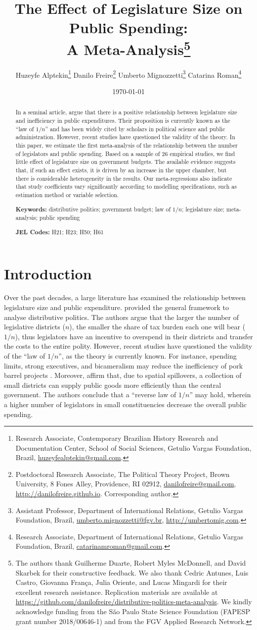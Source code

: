 \documentclass[a4paper,12pt]{article}
\title{The Effect of Legislature Size on Public Spending:\\ A Meta-Analysis\thanks{The authors thank Guilherme Duarte, Robert Myles McDonnell, and David Skarbek for their constructive feedback. We also thank Cedric Antunes, Luis Castro, Giovanna França, Julia Oriente, and Lucas Mingardi for their excellent research assistance. Replication materials are available at \url{https://github.com/danilofreire/distributive-politics-meta-analysis}. We kindly acknowledge funding from the São Paulo State Science Foundation (FAPESP grant number 2018/00646-1) and from the FGV Applied Research Network.}}
\author{Huzeyfe Alptekin\thanks{Research Associate, Contemporary Brazilian History Research and Documentation Center, School of Social Sciences, Getulio Vargas Foundation, Brazil, \url{huzeyfealptekin@gmail.com}.} \hspace{.5cm} Danilo Freire\thanks{Postdoctoral Research Associate, The Political Theory Project, Brown University, 8 Fones Alley, Providence, RI 02912, \url{danilofreire@gmail.com}, \url{http://danilofreire.github.io}. Corresponding author.} \hspace{.5cm} Umberto Mignozzetti\thanks{Assistant Professor, Department of International Relations, Getulio Vargas Foundation, Brazil, \url{umberto.mignozzetti@fgv.br}, \url{http://umbertomig.com}.} \hspace{.5cm} Catarina Roman\thanks{Research Associate, Department of International Relations, Getulio Vargas Foundation, Brazil, \url{catarinamroman@gmail.com}.}}
\date{\today}
\begin{document}
\maketitle

\begin{abstract}
\noindent In a seminal article, \citet{weingast1981political} argue that there
is a positive relationship between legislature size and inefficiency in public
expenditures. Their proposition is currently known as the ``law of $1/n$'' and
has been widely cited by scholars in political science and public
administration.  However, recent studies have questioned the validity of the
theory. In this paper, we estimate the first meta-analysis of the relationship
between the number of legislators and public spending. Based on a sample of 26
empirical studies, we find little effect of legislature size on government
budgets. The available evidence suggests that, if such an effect exists, it is
driven by an increase in the upper chamber, but there is considerable
heterogeneity in the results. Our meta-regressions also indicate that study
coefficients vary significantly according to modelling specifications, such as
estimation method or variable selection.

\vspace{.4cm}
\noindent \textbf{Keywords:} distributive politics; government budget; law of
$1/n$; legislature size; meta-analysis; public spending

\noindent \textbf{JEL Codes:} H21; H23; H50; H61
\end{abstract}

\newpage

\section{Introduction}
\label{sec:intro}

Over the past decades, a large literature has examined the relationship between
legislature size and public expenditure. \citet{weingast1981political} provided
the general framework to analyse distributive politics. The authors argue that
the larger the number of legislative districts ($n$), the smaller the share of
tax burden each one will bear ($1/n$), thus legislators have an incentive to
overspend in their districts and transfer the costs to the entire polity.
However, recent studies have questioned the validity of the ``law of $1/n$'', as
the theory is currently known. For instance, spending limits, strong executives,
and bicameralism may reduce the inefficiency of pork barrel projects
\citep{bradbury2009spatially,chen_malhotra_2007,primo2006stop}.  Moreover,
\citet{primo2008distributive} affirm that, due to spatial spillovers, a
collection of small districts can supply public goods more efficiently than the
central government. The authors conclude that a ``reverse law of $1/n$'' may
hold, wherein a higher number of legislators in small constituencies decrease
the overall public spending.
\end{document}
